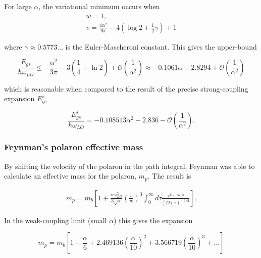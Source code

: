 For large $\alpha$, the variational minimum occurs when
\begin{equation}
\begin{gathered}
     w = 1, \\ 
     v = \frac{4\alpha^2}{9\pi} - 4\left( \log2 + \frac{1}{2} \gamma \right) + 1
\end{gathered}
\end{equation}

where $\gamma \approx 0.5773\dots$ is the Euler-Mascheroni constant. This gives the upper-bound

\begin{equation}
    \frac{E_{gs}}{\hbar\omega_{LO}} \leq -\frac{\alpha^2}{3\pi} - 3 \left(\frac{1}{4} + \ln 2\right) + \mathcal{O}\left(\frac{1}{\alpha^2}\right) \approx -0.1061\alpha - 2.8294 + \mathcal{O}\left(\frac{1}{\alpha^2}\right)
\end{equation}

which is reasonable when compared to the result of the precise strong-coupling expansion $E^s_{gs}$

\begin{equation}
    \frac{E^s_{gs}}{\hbar\omega_{LO}} = -0.108513 \alpha^2 - 2.836 - \mathcal{O}\left(\frac{1}{\alpha^2}\right).
\end{equation}

\subsubsection{Feynman's polaron effective mass}
\label{subsubsec:2-2-5-1}

By shifting the velocity of the polaron in the path integral, Feynman was able to calculate an effective mass for the polaron, $m_p$. The result is

\begin{equation}
\begin{gathered}
    \label{eqn:mass_feynman}
    m_p = m_b \left[ 1 + \frac{\alpha \omega^3_{LO}}{3\sqrt{\pi}} \left(\frac{v}{w}\right)^3 \int^\infty_0 d\tau \frac{\tau^2 e^{-\tau \omega_{LO}}}{[D(\tau)]^{3/2}} \right].
\end{gathered}
\end{equation}

In the weak-coupling limit (small $\alpha$) this gives the expansion

\begin{equation}
    \label{eqn:weak_mass_feynman}
    m_p = m_b \left[ 1 + \frac{\alpha}{6} + 2.469136 \left(\frac{\alpha}{10}\right)^2 + 3.566719 \left(\frac{\alpha}{10}\right)^3 + \dots \right]
\end{equation}

